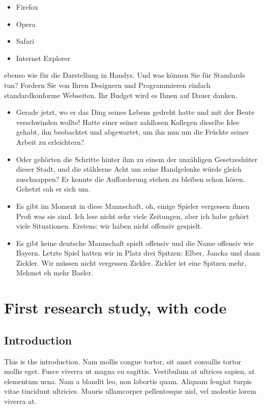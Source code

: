 \begin{itemize}
\tightlist
\item
  Firefox
\item
  Opera
\item
  Safari
\item
  Internet Explorer
\end{itemize}

ebenso wie für die Darstellung in Handys. Und was können Sie für
Standards tun? Fordern Sie von Ihren Designern und Programmieren
einfach standardkonforme Webseiten. Ihr Budget wird es Ihnen auf
Dauer danken.

\begin{itemize}
\item
  Gerade jetzt, wo er das Ding seines Lebens gedreht hatte und mit
  der Beute verschwinden wollte! Hatte einer seiner zahllosen
  Kollegen dieselbe Idee gehabt, ihn beobachtet und abgewartet, um
  ihn nun um die Früchte seiner Arbeit zu erleichtern?
\item
  Oder gehörten die Schritte hinter ihm zu einem der unzähligen
  Gesetzeshüter dieser Stadt, und die stählerne Acht um seine
  Handgelenke würde gleich zuschnappen? Er konnte die Aufforderung
  stehen zu bleiben schon hören. Gehetzt sah er sich um.
\item
  Es gibt im Moment in diese Mannschaft, oh, einige Spieler
  vergessen ihnen Profi was sie sind. Ich lese nicht sehr viele
  Zeitungen, aber ich habe gehört viele Situationen. Erstens: wir
  haben nicht offensiv gespielt.
\item
  Es gibt keine deutsche Mannschaft spielt offensiv und die Name
  offensiv wie Bayern. Letzte Spiel hatten wir in Platz drei
  Spitzen: Elber, Jancka und dann Zickler. Wir müssen nicht
  vergessen Zickler. Zickler ist eine Spitzen mehr, Mehmet eh mehr
  Basler.
\end{itemize}

\hypertarget{first-research-study-with-code}{%
\section{First research study, with
code}\label{first-research-study-with-code}}

\hypertarget{introduction}{%
\subsection{Introduction}\label{introduction}}

This is the introduction. Nam mollis congue tortor, sit amet
convallis tortor mollis eget. Fusce viverra ut magna eu sagittis.
Vestibulum at ultrices sapien, at elementum urna. Nam a blandit leo,
non lobortis quam. Aliquam feugiat turpis vitae tincidunt ultricies.
Mauris ullamcorper pellentesque nisl, vel molestie lorem viverra at.

